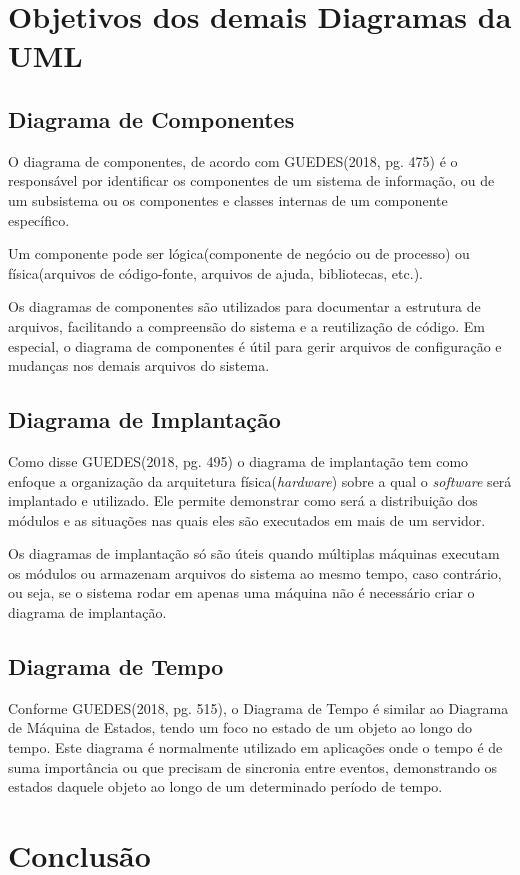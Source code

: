 \documentclass[12pt,openright,oneside,a4paper,
	chapter=TITLE,
	section=TITLE,
	english,brazil]{abntex2}
\begin{document}
\chapter{Objetivos dos demais Diagramas da UML}

\section{Diagrama de Componentes}

O diagrama de componentes, de acordo com GUEDES(2018, pg. 475) é o responsável por identificar os componentes de um sistema de informação, ou de um subsistema ou os componentes e classes internas de um componente específico.

Um componente pode ser lógica(componente de negócio ou de processo) ou física(arquivos de código-fonte, arquivos de ajuda, bibliotecas, etc.).

Os diagramas de componentes são utilizados para documentar a estrutura de arquivos, facilitando a compreensão do sistema e a reutilização de código. Em especial, o diagrama de componentes é útil para gerir arquivos de configuração e mudanças nos demais arquivos do sistema.

\section{Diagrama de Implantação}

Como disse GUEDES(2018, pg. 495) o diagrama de implantação tem como enfoque a organização da arquitetura física(\textit{hardware}) sobre a qual o \textit{software} será implantado e utilizado. Ele permite demonstrar como será a distribuição dos módulos e as situações nas quais eles são executados em mais de um servidor.

Os diagramas de implantação só são úteis quando múltiplas máquinas executam os módulos ou armazenam arquivos do sistema ao mesmo tempo, caso contrário, ou seja, se o sistema rodar em apenas uma máquina não é necessário criar o diagrama de implantação.

\section{Diagrama de Tempo}

Conforme GUEDES(2018, pg. 515), o Diagrama de Tempo é similar ao Diagrama de Máquina de Estados, tendo um foco no estado de um objeto ao longo do tempo. Este diagrama é normalmente utilizado em aplicações onde o tempo é de suma importância ou que precisam de sincronia entre eventos, demonstrando os estados daquele objeto ao longo de um determinado período de tempo.

\chapter{Conclusão}

\postextual


\nocite{GUEDES}
\nocite{BEZERRA}
\nocite{LARMAN}
\end{document}
